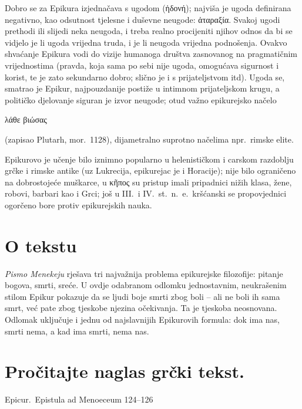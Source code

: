 Dobro se za Epikura izjednačava s ugodom (ἡδονή); najviša je ugoda definirana negativno, kao odsutnost tjelesne i duševne neugode: ἀταραξία. Svakoj ugodi prethodi ili slijedi neka neugoda, i treba realno procijeniti njihov odnos da bi se vidjelo je li ugoda vrijedna truda, i je li neugoda vrijedna podnošenja. Ovakvo shvaćanje Epikura vodi do vizije humanoga društva zasnovanog na pragmatičnim vrijednostima (pravda, koja sama po sebi nije ugoda, omogućava sigurnost i korist, te je zato sekundarno dobro; slično je i s prijateljstvom itd). Ugoda se, smatrao je Epikur, najpouzdanije postiže u intimnom prijateljskom krugu, a političko djelovanje siguran je izvor neugode; otud važno epikurejsko načelo \begin{greek}λάθε βιώσας\end{greek} (zapisao Plutarh, mor.~1128), dijametralno suprotno načelima npr.\ rimske elite.

Epikurovo je učenje bilo iznimno popularno u helenističkom i carskom razdoblju grčke i rimske antike (uz Lukrecija, epikurejac je i Horacije); nije bilo ograničeno na dobrostojeće muškarce, u κῆπος su pristup imali pripadnici nižih klasa, žene, robovi, barbari kao i Grci; još u III.\ i IV.~st.\ n.~e.\ kršćanski se propovjednici ogorčeno bore protiv epikurejskih nauka.

\section*{O tekstu}

\textit{Pismo Menekeju} rješava tri najvažnija problema epikurejske filozofije: pitanje bogova, smrti, sreće. U ovdje odabranom odlomku jednostavnim, neukrašenim stilom Epikur pokazuje da se ljudi boje smrti zbog boli – ali ne boli ih sama smrt, već pate zbog tjeskobe njezina očekivanja. Ta je tjeskoba neosnovana. Odlomak uključuje i jednu od najslavnijih Epikurovih formula: dok ima nas, smrti nema, a kad ima smrti, nema nas.

\newpage

\section*{Pročitajte naglas grčki tekst.}

Epicur.\ Epistula ad Menoeceum 124–126


\medskip


